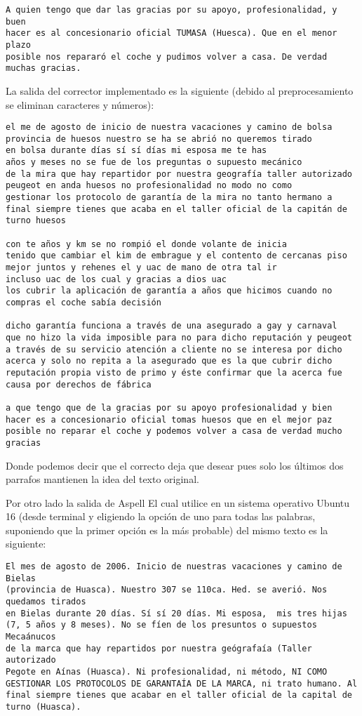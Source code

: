 \documentclass[paper=letter, fontsize=11pt]{scrartcl}
\numberwithin{equation}{section} %
\numberwithin{figure}{section} %
\numberwithin{table}{section} %
\begin{document}
\begin{enumerate}
\begin{verbatim}
A quien tengo que dar las gracias por su apoyo, profesionalidad, y buen
hacer es al concesionario oficial TUMASA (Huesca). Que en el menor plazo
posible nos repararó el coche y pudimos volver a casa. De verdad muchas gracias.
\end{verbatim}
La salida del corrector implementado es la siguiente (debido al preprocesamiento se eliminan caracteres y números):\\

\begin{verbatim}
el me de agosto de inicio de nuestra vacaciones y camino de bolsa 
provincia de huesos nuestro se ha se abrió no queremos tirado
en bolsa durante días sí sí días mi esposa me te has
años y meses no se fue de los preguntas o supuesto mecánico
de la mira que hay repartidor por nuestra geografía taller autorizado
peugeot en anda huesos no profesionalidad no modo no como
gestionar los protocolo de garantía de la mira no tanto hermano a 
final siempre tienes que acaba en el taller oficial de la capitán de turno huesos 

con te años y km se no rompió el donde volante de inicia 
tenido que cambiar el kim de embrague y el contento de cercanas piso
mejor juntos y rehenes el y uac de mano de otra tal ir 
incluso uac de los cual y gracias a dios uac 
los cubrir la aplicación de garantía a años que hicimos cuando no
compras el coche sabía decisión

dicho garantía funciona a través de una asegurado a gay y carnaval
que no hizo la vida imposible para no para dicho reputación y peugeot 
a través de su servicio atención a cliente no se interesa por dicho 
acerca y solo no repita a la asegurado que es la que cubrir dicho
reputación propia visto de primo y éste confirmar que la acerca fue
causa por derechos de fábrica 

a que tengo que de la gracias por su apoyo profesionalidad y bien
hacer es a concesionario oficial tomas huesos que en el mejor paz
posible no reparar el coche y podemos volver a casa de verdad mucho gracias
\end{verbatim}
Donde podemos decir que el correcto deja que desear pues solo los últimos dos parrafos mantienen la idea del texto original. 

Por otro lado la salida de  Aspell El cual utilice en un sistema operativo Ubuntu 16 (desde terminal y eligiendo la opción de uno para todas las palabras, suponiendo que la primer opción es la más probable) del mismo texto es la siguiente:

\begin{verbatim}
El mes de agosto de 2006. Inicio de nuestras vacaciones y camino de Bielas
(provincia de Huasca). Nuestro 307 se 110ca. Hed. se averió. Nos quedamos tirados
en Bielas durante 20 días. Sí sí 20 días. Mi esposa,  mis tres hijas
(7, 5 años y 8 meses). No se fíen de los presuntos o supuestos Mecaánucos
de la marca que hay repartidos por nuestra geógrafaía (Taller autorizado
Pegote en Aínas (Huasca). Ni profesionalidad, ni método, NI COMO 
GESTIONAR LOS PROTOCOLOS DE GARANTAÍA DE LA MARCA, ni trato humano. Al
final siempre tienes que acabar en el taller oficial de la capital de turno (Huasca).


\end{verbatim}
\end{enumerate}
\end{document}
